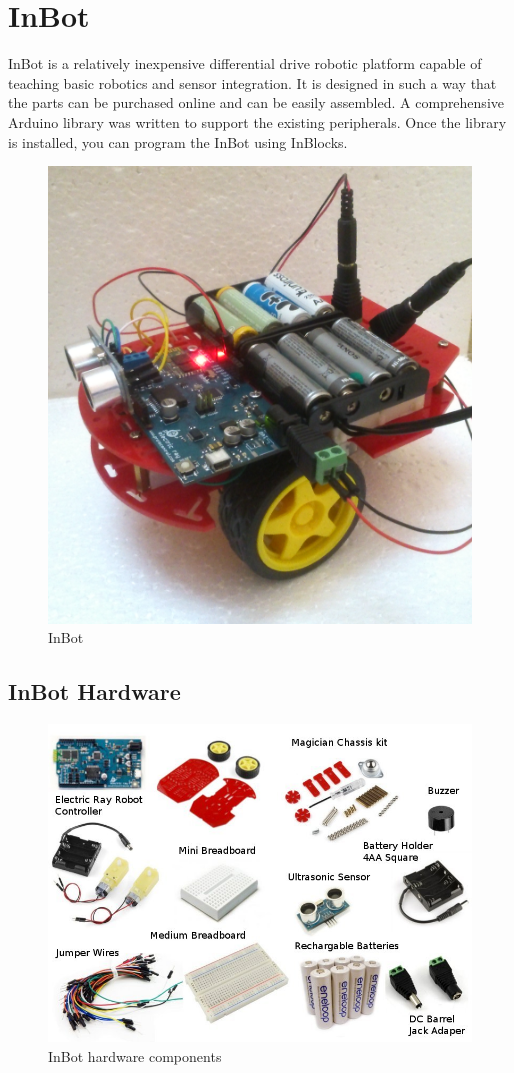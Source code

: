 
\chapter{InBot}\label{chap:inbot}

InBot is a relatively inexpensive differential drive robotic platform capable of teaching basic robotics and sensor integration. It is designed in such a way that the parts can be purchased online and can be easily assembled. A comprehensive Arduino library was written to support the existing peripherals. Once the library is installed, you can program the InBot using InBlocks. 
\begin{figure}[h]
\centering
\includegraphics[width=0.4\columnwidth]{Images/InBot}
\caption{InBot}
\label{fig:inbot}
\end{figure}

\section{InBot Hardware}

\begin{figure}[h]
\centering
\includegraphics[width=1\columnwidth]{Images/parts}
\caption{InBot hardware components}
\label{fig:components}
\end{figure}

